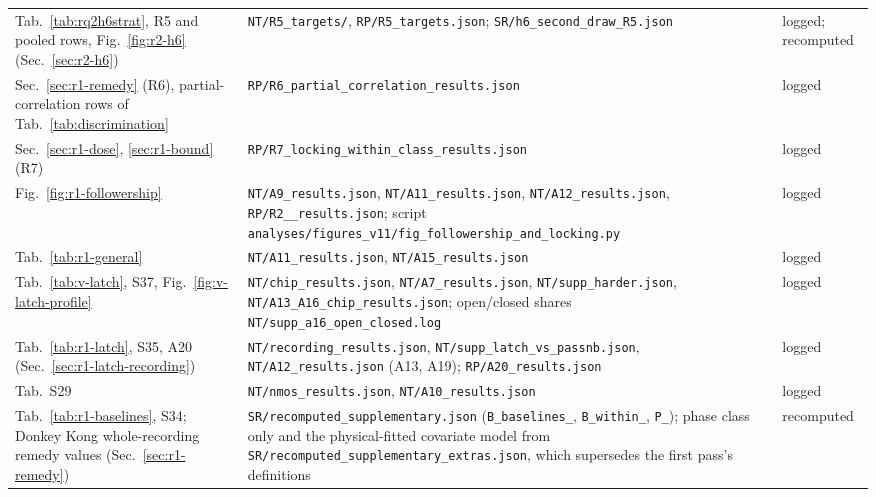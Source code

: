 \begin{longtable}{@{}L{0.25\textwidth}L{0.50\textwidth}L{0.19\textwidth}@{}}
Tab.~\ref{tab:rq2h6strat}, R5 and pooled rows, Fig.~\ref{fig:r2-h6} (Sec.~\ref{sec:r2-h6}) & \texttt{NT/\allowbreak R5\_\allowbreak targets/}, \texttt{RP/\allowbreak R5\_\allowbreak targets.json}; \texttt{SR/\allowbreak h6\_\allowbreak second\_\allowbreak draw\_\allowbreak R5.json} & logged; recomputed \\
Sec.~\ref{sec:r1-remedy} (R6), partial-correlation rows of Tab.~\ref{tab:discrimination} & \texttt{RP/\allowbreak R6\_\allowbreak partial\_\allowbreak correlation\_\allowbreak results.json} & logged \\
Sec.~\ref{sec:r1-dose}, \ref{sec:r1-bound} (R7) & \texttt{RP/\allowbreak R7\_\allowbreak locking\_\allowbreak within\_\allowbreak class\_\allowbreak results.json} & logged \\
Fig.~\ref{fig:r1-followership} & \texttt{NT/\allowbreak A9\_\allowbreak results.json}, \texttt{NT/\allowbreak A11\_\allowbreak results.json}, \texttt{NT/\allowbreak A12\_\allowbreak results.json}, \texttt{RP/\allowbreak R2\_\allowbreak *\_\allowbreak results.json}; script \texttt{analyses/\allowbreak figures\_\allowbreak v11/\allowbreak fig\_\allowbreak followership\_\allowbreak and\_\allowbreak locking.py} & logged \\
Tab.~\ref{tab:r1-general} & \texttt{NT/\allowbreak A11\_\allowbreak results.json}, \texttt{NT/\allowbreak A15\_\allowbreak results.json} & logged \\
Tab.~\ref{tab:v-latch}, S37, Fig.~\ref{fig:v-latch-profile} & \texttt{NT/\allowbreak chip\_\allowbreak results.json}, \texttt{NT/\allowbreak A7\_\allowbreak results.json}, \texttt{NT/\allowbreak supp\_\allowbreak harder.json}, \texttt{NT/\allowbreak A13\_\allowbreak A16\_\allowbreak chip\_\allowbreak results.json}; open/closed shares \texttt{NT/\allowbreak supp\_\allowbreak a16\_\allowbreak open\_\allowbreak closed.log} & logged \\
Tab.~\ref{tab:r1-latch}, S35, A20 (Sec.~\ref{sec:r1-latch-recording}) & \texttt{NT/\allowbreak recording\_\allowbreak results.json}, \texttt{NT/\allowbreak supp\_\allowbreak latch\_\allowbreak vs\_\allowbreak passnb.json}, \texttt{NT/\allowbreak A12\_\allowbreak results.json} (A13, A19); \texttt{RP/\allowbreak A20\_\allowbreak results.json} & logged \\
Tab.~S29 & \texttt{NT/\allowbreak nmos\_\allowbreak results.json}, \texttt{NT/\allowbreak A10\_\allowbreak results.json} & logged \\
Tab.~\ref{tab:r1-baselines}, S34; Donkey Kong whole-recording remedy values (Sec.~\ref{sec:r1-remedy}) & \texttt{SR/\allowbreak recomputed\_\allowbreak supplementary.json} (\texttt{B\_\allowbreak baselines\_\allowbreak *}, \texttt{B\_\allowbreak within\_\allowbreak *}, \texttt{P\_\allowbreak *}); phase class only and the physical-fitted covariate model from \texttt{SR/\allowbreak recomputed\_\allowbreak supplementary\_\allowbreak extras.json}, which supersedes the first pass's definitions & recomputed \\

\end{longtable}

